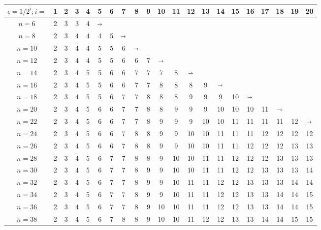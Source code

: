 \begin{adjustbox}{center}
\begin{tabular}{|c||c|c|c|c|c|c|c|c|c|c|c|c|c|c|c|c|c|c|c|c|}
\hline
$\epsilon=1/2^i; i=$ & 1 & 2 & 3 & 4 & 5 & 6 & 7 & 8 & 9 & 10 & 11 & 12 & 13 & 14 & 15 & 16 & 17 & 18 & 19 & 20  \\ \hline \hline
$n=6$ & 2 & 3 & 3 & 4 & $\shortrightarrow$ \\ \cline{1-8}
$n=8$ & 2 & 3 & 4 & 4 & 4 & 5 & $\shortrightarrow$ \\ \cline{1-9}
$n=10$ & 2 & 3 & 4 & 4 & 5 & 5 & 6 & $\shortrightarrow$ \\ \cline{1-11}
$n=12$ & 2 & 3 & 4 & 4 & 5 & 5 & 6 & 6 & 7 & $\shortrightarrow$\\ \cline{1-13}
$n=14$ & 2 & 3 & 4 & 5 & 5 & 6 & 6 & 7 & 7 & 7 & 8 & $\shortrightarrow$ \\ \cline{1-15}
$n=16$ & 2 & 3 & 4 & 5 & 5 & 6 & 6 & 7 & 7 & 8 & 8 & 8 & 9 & $\shortrightarrow$ \\ \cline{1-17}
$n=18$ & 2 & 3 & 4 & 5 & 5 & 6 & 7 & 7 & 8 & 8 & 8 & 9 & 9 & 9 & 10 & $\shortrightarrow$ \\ \cline{1-19}
$n=20$ & 2 & 3 & 4 & 5 & 6 & 6 & 7 & 7 & 8 & 8 & 9 & 9 & 9 & 10 & 10 & 10 & 11 & $\shortrightarrow$ \\ \hline
$n=22$ & 2 & 3 & 4 & 5 & 6 & 6 & 7 & 7 & 8 & 9 & 9 & 9 & 10 & 10 & 11 & 11 & 11 & 11 & 12 & $\shortrightarrow$ \\ \hline
$n=24$ & 2 & 3 & 4 & 5 & 6 & 6 & 7 & 8 & 8 & 9 & 9 & 10 & 10 & 11 & 11 & 11 & 12 & 12 & 12 & 12 \\ \hline
$n=26$ & 2 & 3 & 4 & 5 & 6 & 6 & 7 & 8 & 8 & 9 & 9 & 10 & 10 & 11 & 11 & 12 & 12 & 12 & 13 & 13 \\ \hline
$n=28$ & 2 & 3 & 4 & 5 & 6 & 7 & 7 & 8 & 8 & 9 & 10 & 10 & 11 & 11 & 12 & 12 & 12 & 13 & 13 & 13 \\ \hline
$n=30$ & 2 & 3 & 4 & 5 & 6 & 7 & 7 & 8 & 9 & 9 & 10 & 10 & 11 & 11 & 12 & 12 & 13 & 13 & 13 & 14 \\ \hline
$n=32$ & 2 & 3 & 4 & 5 & 6 & 7 & 7 & 8 & 9 & 9 & 10 & 11 & 11 & 12 & 12 & 13 & 13 & 13 & 14 & 14 \\ \hline
$n=34$ & 2 & 3 & 4 & 5 & 6 & 7 & 7 & 8 & 9 & 9 & 10 & 11 & 11 & 12 & 12 & 13 & 13 & 14 & 14  & 15 \\ \hline
$n=36$ & 2 & 3 & 4 & 5 & 6 & 7 & 7 & 8 & 9 & 10 & 10 & 11 & 11 & 12 & 12 & 13 & 13 & 14 & 14 & 15 \\ \hline
$n=38$ & 2 & 3 & 4 & 5 & 6 & 7 & 8 & 8 & 9 & 10 & 10 & 11 & 12 & 12 & 13 & 13 & 14 & 14 & 15 & 15 \\ \hline

\end{tabular}
\end{adjustbox}
